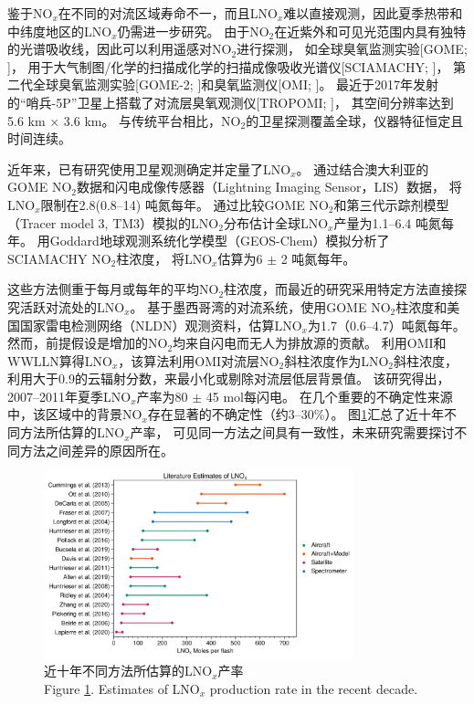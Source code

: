 鉴于NO$_x$在不同的对流区域寿命不一，而且LNO$_x$难以直接观测，因此夏季热带和中纬度地区的LNO$_x$仍需进一步研究。
由于NO$_2$在近紫外和可见光范围内具有独特的光谱吸收线，因此可以利用遥感对NO$_2$进行探测\citep{Platt.1983}，
如全球臭氧监测实验[GOME; \citet{Burrows.1999}]，
用于大气制图/化学的扫描成化学的扫描成像吸收光谱仪[SCIAMACHY; \citet{Bovensmann.1999}]，
第二代全球臭氧监测实验[GOME-2; \citet{Callies.2000}]和臭氧监测仪[OMI; \citet{Levelt.2006}]。
最近于2017年发射的“哨兵-5P”卫星上搭载了对流层臭氧观测仪[TROPOMI; \citet{Veefkind.2012}]，
其空间分辨率达到5.6 km $\times$ 3.6 km。
与传统平台相比，NO$_2$的卫星探测覆盖全球，仪器特征恒定且时间连续。

近年来，已有研究使用卫星观测确定并定量了LNO$_x$。
\citet{Beirle.2004}通过结合澳大利亚的GOME NO$_2$数据和闪电成像传感器（Lightning Imaging Sensor，LIS）数据，
将LNO$_x$限制在2.8(0.8--14) 吨氮每年。
\citet{Boersma.2005}通过比较GOME NO$_2$和第三代示踪剂模型（Tracer model 3, TM3）模拟的LNO$_2$分布估计全球LNO$_x$产量为1.1--6.4 吨氮每年。
\citet{Martin.2007a}用Goddard地球观测系统化学模型（GEOS-Chem）模拟分析了SCIAMACHY NO$_2$柱浓度，
将LNO$_x$估算为6 $\pm$ 2 吨氮每年。

这些方法侧重于每月或每年的平均NO$_2$柱浓度，而最近的研究采用特定方法直接探究活跃对流处的LNO$_x$。
\citet{Beirle.2006}基于墨西哥湾的对流系统，使用GOME NO$_2$柱浓度和美国国家雷电检测网络（NLDN）观测资料，估算LNO$_x$为1.7（0.6–4.7）吨氮每年。
然而，前提假设是增加的NO$_2$均来自闪电而无人为排放源的贡献。
\citet{Pickering.2016} 利用OMI和WWLLN算得LNO$_x$，该算法利用OMI对流层NO$_2$斜柱浓度作为LNO$_2$斜柱浓度，利用大于0.9的云辐射分数，来最小化或剔除对流层低层背景值。
该研究得出，2007--2011年夏季LNO$_x$产率为80 $\pm$ 45 mol每闪电。
在几个重要的不确定性来源中，该区域中的背景NO$_x$存在显著的不确定性（约3--30\%）。
图\ref{figure:lnox_production_xin}汇总了近十年不同方法所估算的LNO$_x$产率，
可见同一方法之间具有一致性，未来研究需要探讨不同方法之间差异的原因所在。

\begin{figure}[htbp]
\centering
\includegraphics[width=0.8\textwidth]{./figures/lnox_production_xin.png}
\caption{近十年不同方法所估算的LNO$_x$产率\\
Figure \ref{figure:lnox_production_xin}. Estimates of LNO$_x$ production rate in the recent decade.}
\label{figure:lnox_production_xin}
\end{figure}

